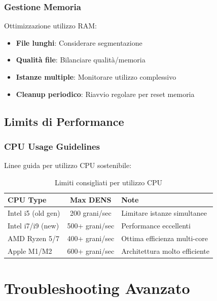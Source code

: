 \documentclass[a4paper,11pt,openany]{book}
\begin{document}
\subsubsection{Gestione Memoria}

Ottimizzazione utilizzo RAM:

\begin{itemize}
    \item \textbf{File lunghi}: Considerare segmentazione
    \item \textbf{Qualità file}: Bilanciare qualità/memoria
    \item \textbf{Istanze multiple}: Monitorare utilizzo complessivo
    \item \textbf{Cleanup periodico}: Riavvio regolare per reset memoria
\end{itemize}

\subsection{Limits di Performance}

\subsubsection{CPU Usage Guidelines}

Linee guida per utilizzo CPU sostenibile:


\begin{table}[H]
    \centering
    \caption{Limiti consigliati per utilizzo CPU}
    \label{tab:cpu_limits}
    \begin{tabular}{@{}p{3cm}cp{6cm}@{}}
        \toprule
        \textbf{CPU Type} & \textbf{Max DENS} & \textbf{Note} \\
        \midrule
        Intel i5 (old gen) & 200 grani/sec & Limitare istanze simultanee \\
        Intel i7/i9 (new) & 500+ grani/sec & Performance eccellenti \\
        AMD Ryzen 5/7 & 400+ grani/sec & Ottima efficienza multi-core \\
        Apple M1/M2 & 600+ grani/sec & Architettura molto efficiente \\
        \bottomrule
    \end{tabular}
\end{table}

\section{Troubleshooting Avanzato}
\end{document}
